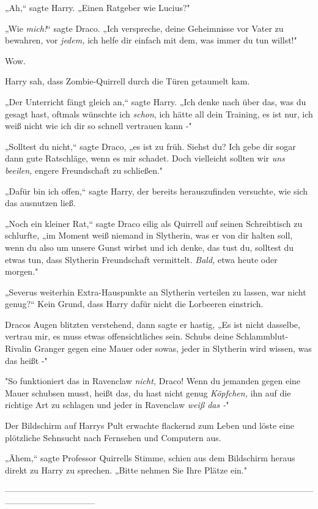 {„Ah,“ sagte Harry. „Einen Ratgeber wie Lucius?"

„Wie \emph{mich!}“ sagte Draco. „Ich verspreche, deine Geheimnisse vor Vater zu bewahren, vor \emph{jedem,} ich helfe dir einfach mit dem, was immer du tun willst!"

Wow.

Harry sah, dass Zombie-Quirrell durch die Türen getaumelt kam.

„Der Unterricht fängt gleich an,“ sagte Harry. „Ich denke nach über das, was du gesagt hast, oftmals wünschte ich \emph{schon}, ich hätte all dein Training, es ist nur, ich weiß nicht wie ich dir so schnell vertrauen kann -"

„Solltest du nicht,“ sagte Draco, „es ist zu früh. Siehst du? Ich gebe dir sogar dann gute Ratschläge, wenn es mir schadet. Doch vielleicht sollten wir \emph{uns beeilen,} engere Freundschaft zu schließen."

„Dafür bin ich offen,“ sagte Harry, der bereits herauszufinden versuchte, wie sich das ausnutzen ließ.

„Noch ein kleiner Rat,“ sagte Draco eilig als Quirrell auf seinen Schreibtisch zu schlurfte, „im Moment weiß niemand in Slytherin, was er von dir halten soll, wenn du also um unsere Gunst wirbst und ich denke, das tust du, solltest du etwas tun, dass Slytherin Freundschaft vermittelt. \emph{Bald,} etwa heute oder morgen."

„Severus weiterhin Extra-Hauspunkte an Slytherin verteilen zu lassen, war nicht genug?“ Kein Grund, dass Harry dafür nicht die Lorbeeren einstrich.

Dracos Augen blitzten verstehend, dann sagte er hastig, „Es ist nicht dasselbe, vertrau mir, es muss etwas offensichtliches sein. Schubs deine Schlammblut-Rivalin Granger gegen eine Mauer oder sowas, jeder in Slytherin wird wissen, was das heißt -"

"So funktioniert das in Ravenclaw \emph{nicht,} Draco! Wenn du jemanden gegen eine Mauer schubsen musst, heißt das, du hast nicht genug \emph{Köpfchen,} ihn auf die richtige Art zu schlagen und jeder in Ravenclaw \emph{weiß das -}"

Der Bildschirm auf Harrys Pult erwachte flackernd zum Leben und löste eine plötzliche Sehnsucht nach Fernsehen und Computern aus.

„Ähem,“ sagte Professor Quirrells Stimme, schien aus dem Bildschirm heraus direkt zu Harry zu sprechen. „Bitte nehmen Sie Ihre Plätze ein."

--------------------------------------------------------------------------------------------------------------------------------------------

}
